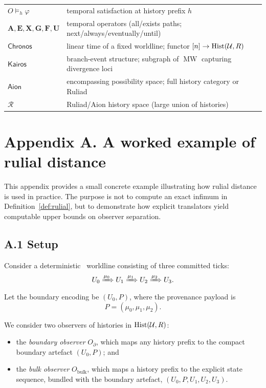 \documentclass{aion}
\DeclareMathOperator{\MW}{MW}
\newcommand{\Ruliad}{\mathcal{R}}
\newcommand{\Chronos}{\mathsf{Chronos}}
\newcommand{\Kairos}{\mathsf{Kairos}}
\newcommand{\Aion}{\mathsf{Aion}}
\providecommand{\sectionbreak}{\clearpage}
\begin{document}
\begin{center}
\begin{tabularx}{\linewidth}{lX}
  $O\models_h \varphi$ & temporal satisfaction at history prefix $h$ \\
  $\mathbf{A},\mathbf{E},\mathbf{X},\mathbf{G},\mathbf{F},\mathbf{U}$ & temporal operators (all/exists paths; next/always/eventually/until) \\
  $\Chronos$ & linear time of a fixed worldline; functor $[n]\to\operatorname{Hist}(\mathcal{U},R)$ \\
  $\Kairos$ & branch-event structure; subgraph of $\MW$ capturing divergence loci \\
  $\Aion$ & encompassing possibility space; full history category or Ruliad \\
  $\Ruliad$ & Ruliad/Aion history space (large union of histories) \\
\end{tabularx}
\end{center}

\sectionbreak

\appendix
\section*{Appendix A. A worked example of rulial distance}

This appendix provides a small concrete example illustrating how rulial distance is used in
practice. The purpose is not to compute an exact infimum in Definition~\ref{def:rulial}, but to demonstrate
how explicit translators yield computable upper bounds on observer separation.

\subsection*{A.1 Setup}

Consider a deterministic \WARP\ worldline consisting of three committed ticks:
\[
U_0 \xRightarrow{\mu_0} U_1 \xRightarrow{\mu_1} U_2 \xRightarrow{\mu_2} U_3 .
\]
Let the boundary encoding be $(U_0, P)$, where the provenance payload is
\[
P = (\mu_0, \mu_1, \mu_2).
\]

We consider two observers of histories in $\operatorname{Hist}(\mathcal{U},R)$:
\begin{itemize}
\item the \emph{boundary observer} $O_\partial$, which maps any history prefix to the compact
boundary artefact $(U_0,P)$; and
\item the \emph{bulk observer} $O_{\mathrm{bulk}}$, which maps a history prefix to the explicit
state sequence, bundled with the boundary artefact, $(U_0,P,U_1,U_2,U_3)$.
\end{itemize}
\end{document}
